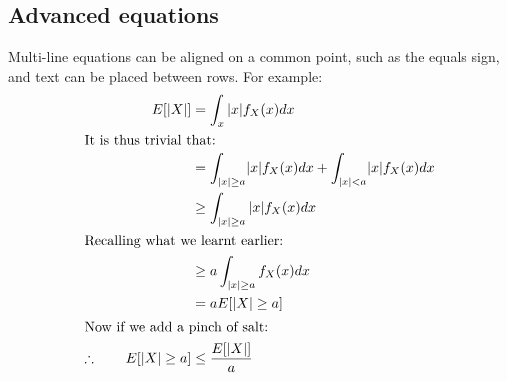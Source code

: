 

\subsection{Advanced equations}

Multi-line equations can be aligned on a common point, such as the equals sign, and text can be placed between rows. For example:
\begin{subequations}
\label{eq:pc}
\begin{align}
 E[|X|] &= \int_{x} |x| f_X(x) dx \\
 \intertext{It is thus trivial that:}
 &= \int_{|x| \ge a} \! |x| f_X(x) dx + \int_{|x| < a} \! |x| f_X(x) dx \\
 &\ge \int_{|x| \ge a} |x| f_X(x) dx \\
 \intertext{Recalling what we learnt earlier:}
 &\ge a \int_{|x| \ge a} f_X(x) dx \\
 &= a E[|X| \ge a]\\
 \intertext{Now if we add a pinch of salt:}
 \therefore \qquad E[|X| \ge a] &\le \frac{E[|X|]}{a}
\end{align}
\end{subequations} 



